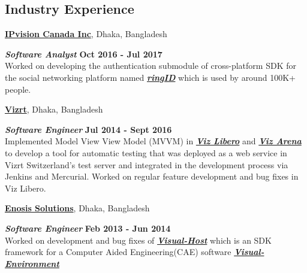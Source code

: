 \documentclass[margin,line]{res}
\begin{document}
\begin{resume}
\section{\sc Industry Experience}
{\bf \href{http://www.ipvision.ca/}{IPvision Canada Inc}}, Dhaka, Bangladesh

\vspace{-.4cm}
\textbf{{\em Software Analyst}} \hfill {\bf Oct 2016 - Jul 2017}\\
Worked on developing the authentication submodule of cross-platform SDK for the social networking platform named \textbf{\textit{\href{https://www.ringid.com/}{ringID}}} which is used by around 100K+ people.

\vspace{-.2cm}
{\bf \href{http://www.vizrt.com/}{Vizrt}}, Dhaka, Bangladesh

\vspace{-.4cm}
\textbf{{\em Software Engineer}} \hfill {\bf Jul 2014 - Sept 2016}\\
Implemented Model View View Model (MVVM) in \textbf{\textit{\href{http://www.vizrt.com/products/viz_libero/}{Viz Libero}}} and \textbf{\textit{\href{http://www.vizrt.com/products/viz_arena/}{Viz Arena}}} to develop a tool for automatic testing that was deployed as a web service in Vizrt Switzerland's test server and integrated in the development process via Jenkins and Mercurial.
Worked on regular feature development and bug fixes in Viz Libero.

\vspace{-.2cm}
{\bf \href{http://www.enosisbd.com/}{Enosis Solutions}}, Dhaka, Bangladesh

\vspace{-.4cm}
\textbf{{\em Software Engineer}} \hfill {\bf Feb 2013 - Jun 2014}\\
Worked on development and bug fixes of \textbf{\textit{\href{http://www.enosisbd.com/downloads/dev_engineering.pdf}{Visual-Host}}} which is an SDK framework for a Computer Aided Engineering(CAE) software \textbf{\textit{\href{https://www.esi-group.com/software-solutions/virtual-integration-platform/multi-domain-simulation/visual-environment}{Visual-Environment}}}

\vspace*{-.1in}


\end{resume}
\end{document}
